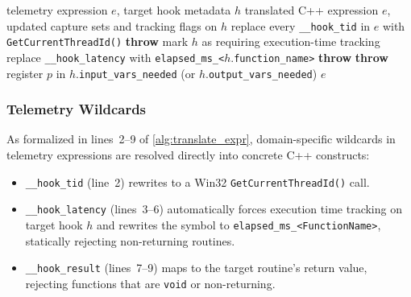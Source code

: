 \begin{algorithm}[t]
	\caption{Static telemetry expression translation (\texttt{translate\_telemetry\_expr})}
	\label{alg:translate_expr}
	\begin{algorithmic}[1]
		\Require telemetry expression $e$, target hook metadata $h$
		\Ensure translated C++ expression $e$, updated capture sets and tracking flags on $h$
		\State replace every \texttt{\_\_hook\_tid} in $e$ with \texttt{GetCurrentThreadId()}
				\State \textbf{throw}  
			\EndIf
			\State mark $h$ as requiring execution-time tracking
			\State replace \texttt{\_\_hook\_latency} with \texttt{elapsed\_ms\_<}$h$.\texttt{function\_name}\texttt{>}
		\EndIf
				\State \textbf{throw}  
			\EndIf
		\EndIf
				\State \textbf{throw} 
			\EndIf
			\State register $p$ in $h$.\texttt{input\_vars\_needed} (or $h$.\texttt{output\_vars\_needed})
		\EndFor
		\State \Return $e$
	\end{algorithmic}
\end{algorithm}

\subsubsection{Telemetry Wildcards}

As formalized in lines~2--9 of \cref{alg:translate_expr}, domain-specific wildcards in telemetry expressions are resolved directly into concrete C++ constructs:
\begin{itemize}
	\item \texttt{\_\_hook\_tid} (line~2) rewrites to a Win32 \texttt{GetCurrentThreadId()} call.
	\item \texttt{\_\_hook\_latency} (lines~3--6) automatically forces execution time tracking on target hook $h$ and rewrites the symbol to \texttt{elapsed\_ms\_<FunctionName>}, statically rejecting non-returning routines.
	\item \texttt{\_\_hook\_result} (lines~7--9) maps to the target routine's return value, rejecting functions that are \texttt{void} or non-returning.
\end{itemize}



